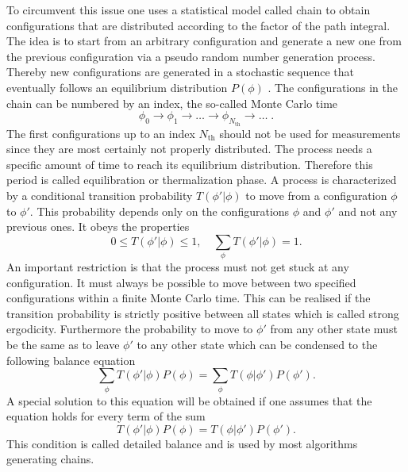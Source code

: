 To circumvent this issue one uses a statistical model called  chain to obtain configurations that are distributed according to the  factor of the path integral. The idea is to start from an arbitrary configuration and generate a new one from the previous configuration via a pseudo random number generation process. Thereby new configurations are generated in a stochastic sequence that eventually follows an equilibrium distribution $P(\mathit{\phi})$ \cite{gattringer2009quantum}. The configurations in the chain can be numbered by an index, the so-called Monte Carlo time
%
%
\begin{equation}
\mathit{\phi}_{0} \rightarrow \mathit{\phi}_{1} \rightarrow \ldots \rightarrow \mathit{\phi}_{N_{\text{th}}} \rightarrow \ldots \; .
\end{equation}
%
%
The first configurations up to an index $N_{\text{th}}$ should not be used for measurements since they are most certainly not properly distributed. The process needs a specific amount of time to reach its equilibrium distribution. Therefore this period is called equilibration or thermalization phase.
A  process is characterized by a conditional transition probability $T(\mathit{\phi}' \vert \mathit{\phi})$ to move from a configuration $\mathit{\phi}$ to $\mathit{\phi}'$. This probability depends only on the configurations $\mathit{\phi}$ and $\mathit{\phi}'$ and not any previous ones. It obeys the properties
%
%
\begin{equation}
0 \leq T(\mathit{\phi}' \vert \mathit{\phi}) \leq 1, \quad \sum\limits_{\mathit{\phi}} T(\mathit{\phi}' \vert \mathit{\phi}) =1.
\label{trans_prob}
\end{equation}
%
%
An important restriction is that the process must not get stuck at any configuration. It must always be possible to move between two specified configurations within a finite Monte Carlo time. This can be realised if the transition probability is strictly positive between all states which is called strong ergodicity. Furthermore the probability to move to $\mathit{\phi}'$ from any other state must be the same as to leave $\mathit{\phi}'$ to any other state which can be condensed to the following balance equation
%
%
\begin{equation}
\sum\limits_{\mathit{\phi}} T(\mathit{\phi}' \vert \mathit{\phi}) P(\mathit{\phi}) = \sum\limits_{\mathit{\phi}} T(\mathit{\phi} \vert \mathit{\phi}') P(\mathit{\phi}').
\end{equation}
%
%
A special solution to this equation will be obtained if one assumes that the equation holds for every term of the sum
%
%
\begin{equation}
T(\mathit{\phi}' \vert \mathit{\phi}) P(\mathit{\phi}) = T(\mathit{\phi} \vert \mathit{\phi}') P(\mathit{\phi}').
\end{equation}
%
%
This condition is called detailed balance and is used by most algorithms generating  chains.
%
%
%
%
%

